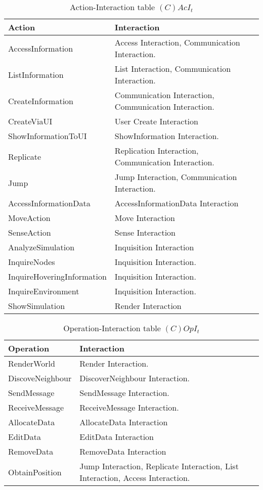 \begin{table}[H]
	\centering
	\begin{tabular}{|p{5cm}|p{7cm}|}
			\hline
			\textbf{Action} & \textbf{Interaction} \\
			\hline
			AccessInformation & Access Interaction, Communication Interaction. \\
			\hline
			ListInformation & List Interaction, Communication Interaction. \\
			\hline
			CreateInformation & Communication Interaction, Communication Interaction.\\
			\hline
			CreateViaUI & User Create Interaction \\
			\hline
      ShowInformationToUI & ShowInformation Interaction.\\
			\hline
			Replicate & Replication Interaction, Communication Interaction.  \\
			\hline
			Jump & Jump Interaction, Communication Interaction. \\
			\hline
			AccessInformationData & AccessInformationData Interaction \\
			\hline
			MoveAction & Move Interaction \\
			\hline
			SenseAction & Sense Interaction \\
			\hline
			AnalyzeSimulation & Inquisition Interaction \\
			\hline
			InquireNodes & Inquisition Interaction. \\
			\hline
			InquireHoveringInformation & Inquisition Interaction. \\
			\hline
			InquireEnvironment & Inquisition Interaction. \\
			\hline
			ShowSimulation & Render Interaction \\
			\hline
		\end{tabular}
	\caption{Action-Interaction table $(C)AcI_t$}
	\label{tab:cacit}
\end{table}

\begin{table}[H]
	\centering
	\begin{tabular}{|p{4cm}|p{8cm}|}
			\hline
			\textbf{Operation} & \textbf{Interaction} \\
			\hline
			RenderWorld & Render Interaction. \\
			\hline
			DiscoveNeighbour & DiscoverNeighbour Interaction. \\
			\hline
			SendMessage & SendMessage Interaction. \\
			\hline
			ReceiveMessage & ReceiveMessage Interaction. \\
			\hline
			AllocateData & AllocateData Interaction \\
			\hline
			EditData & EditData Interaction \\
			\hline
			RemoveData & RemoveData Interaction \\
			\hline
			ObtainPosition & Jump Interaction, Replicate Interaction, List
			Interaction, Access Interaction.  \\
			\hline
		\end{tabular}
	\caption{Operation-Interaction table $(C)OpI_t$}
	\label{tab:opit}
\end{table}

